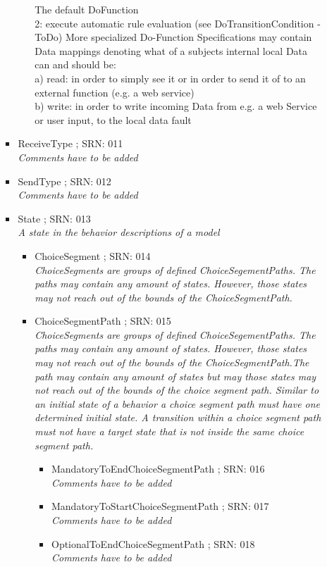 \begin{itemize}
\begin{itemize}
\begin{itemize}
\begin{itemize}
{			The default DoFunction \\2: execute automatic rule evaluation (see DoTransitionCondition - ToDo)
			More specialized Do-Function Specifications may contain Data mappings denoting what of a subjects internal local Data can and should be:\\
			a) read: in order to simply see it or in order to send it of to an external function (e.g. a web service)\\
			b) write: in order to write incoming Data from e.g. a web Service or user input, to the local data fault}
		\end{itemize}
		\item ReceiveType ; SRN: 011 \\ \textit{Comments have to be added}
		\item SendType ; SRN: 012 \\ \textit{Comments have to be added}
		\item State ; SRN: 013 \\ \textit{A state in the behavior descriptions of a model}
		\begin{itemize}
			\item ChoiceSegment ; SRN: 014 \\ \textit{ChoiceSegments are groups of defined ChoiceSegementPaths. The paths may contain any amount of states. However, those states may not reach out of the bounds of the ChoiceSegmentPath.}
			\item ChoiceSegmentPath ; SRN: 015 \\ \textit{ChoiceSegments are groups of defined ChoiceSegementPaths. The paths may contain any amount of states. However, those states may not reach out of the bounds of the ChoiceSegmentPath.The path may contain any amount of states but may those states may not reach out of the bounds of the choice segment path. Similar to an initial state of a behavior a choice segment path must have one determined initial state. A transition within a choice segment path must not have a target state that is not inside the same choice segment path.}
			\begin{itemize}
				\item MandatoryToEndChoiceSegmentPath ; SRN: 016 \\ \textit{Comments have to be added}
				\item MandatoryToStartChoiceSegmentPath ; SRN: 017 \\ \textit{Comments have to be added}
				\item OptionalToEndChoiceSegmentPath ; SRN: 018 \\ \textit{Comments have to be added}

\end{itemize}
\end{itemize}
\end{itemize}
\end{itemize}
\end{itemize}

